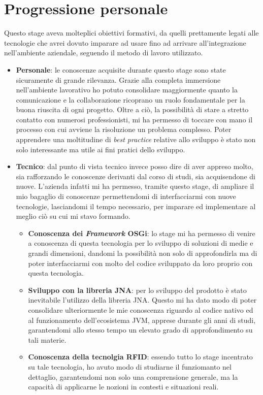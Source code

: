 \section{Progressione personale}
\label{sec:prog-personale}
Questo stage aveva molteplici obiettivi formativi, da quelli prettamente legati alle tecnologie che avrei dovuto imparare ad usare fino ad arrivare all’integrazione 
nell’ambiente aziendale, seguendo il metodo di lavoro utilizzato.
\begin{itemize}
    \item \textbf{Personale}: le conoscenze acquisite durante questo stage sono state sicuramente di grande rilevanza. Grazie alla completa immersione
    nell'ambiente lavorativo ho potuto consolidare maggiormente quanto la comunicazione e la collaborazione ricoprano un ruolo fondamentale per la buona riuscita di ogni progetto.
    Oltre a ciò, la possibilità di stare a stretto contatto con numerosi professionisti, mi ha permesso di toccare con mano il processo con cui avviene la risoluzione un problema complesso.
    Poter apprendere una moltitudine di \emph{best practice} relative allo sviluppo è stato non solo interessante ma utile ai fini pratici dello sviluppo.
    \item \textbf{Tecnico}: dal punto di vista tecnico invece posso dire di aver appreso molto, sia rafforzando le conoscenze derivanti dal corso di studi, 
    sia acquisendone di nuove.
    L’azienda infatti mi ha permesso, tramite questo stage, di ampliare il mio bagaglio di conoscenze permettendomi di interfacciarmi con nuove tecnologie, 
    lasciandomi il tempo necessario, per imparare ed implementare al meglio ciò su cui mi stavo formando.
    \begin{itemize}
        \item \textbf{Conoscenza dei \emph{Framework} OSGi}: lo stage mi ha permesso di venire a conoscenza di questa tecnologia per lo sviluppo di soluzioni di medie e grandi dimensioni,
        dandomi la possibilità non solo di approfondirla ma di poter interfacciarmi con molto del codice sviluppato da loro proprio con questa tecnologia.
        \item \textbf{Sviluppo con la libreria JNA}: per lo sviluppo del prodotto è stato inevitabile l'utilizzo della libreria JNA. Questo mi ha dato modo di poter consolidare
        ulteriormente le mie conoscenza riguardo al codice nativo ed al funzionamento dell'ecosistema JVM, apprese durante gli anni di studi, garantendomi allo stesso tempo
        un elevato grado di approfondimento su tali materie.
        \item \textbf{Conoscenza della tecnolgia RFID}: essendo tutto lo stage incentrato su tale tecnologia, ho avuto modo di studiarne il funziomanto nel dettaglio, garantendomi non solo
        una comprensione generale, ma la capacità di applicarne le nozioni in contesti e situazioni reali.
    \end{itemize}
\end{itemize}


